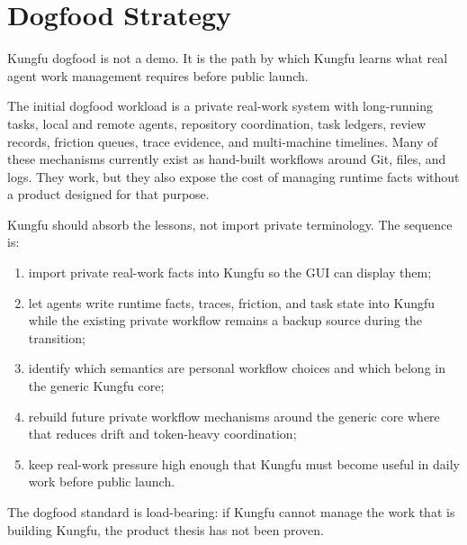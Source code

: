 \section{Dogfood Strategy}

Kungfu dogfood is not a demo. It is the path by which Kungfu learns what real
agent work management requires before public launch.

The initial dogfood workload is a private real-work system with long-running
tasks, local and remote agents, repository coordination, task ledgers, review
records, friction queues, trace evidence, and multi-machine timelines. Many of
these mechanisms currently exist as hand-built workflows around Git, files, and
logs. They work, but they also expose the cost of managing runtime facts
without a product designed for that purpose.

Kungfu should absorb the lessons, not import private terminology. The sequence
is:

\begin{enumerate}[leftmargin=*]
  \item import private real-work facts into Kungfu so the GUI can display them;
  \item let agents write runtime facts, traces, friction, and task state into
  Kungfu while the existing private workflow remains a backup source during the
  transition;
  \item identify which semantics are personal workflow choices and which belong
  in the generic Kungfu core;
  \item rebuild future private workflow mechanisms around the generic core
  where that reduces drift and token-heavy coordination;
  \item keep real-work pressure high enough that Kungfu must become useful in
  daily work before public launch.
\end{enumerate}

The dogfood standard is load-bearing: if Kungfu cannot manage the work that is
building Kungfu, the product thesis has not been proven.
